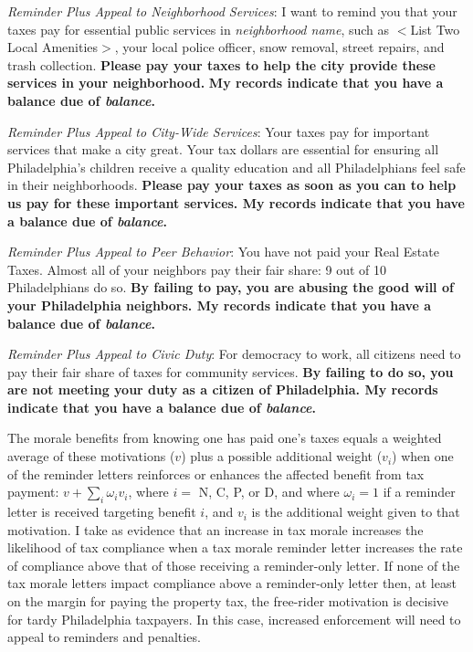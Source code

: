 \bigskip

\noindent \textit{Reminder Plus Appeal to Neighborhood Services}: I
want to remind you that your taxes pay for essential public services
in \textit{neighborhood name}, such as $<$List Two Local Amenities$>$,
your local police officer, snow removal, street repairs, and trash
collection.  \textbf{Please pay your taxes to help the city provide
  these services in your neighborhood.} \textbf{My records indicate
  that you have a balance due of \textit{balance}.}

\bigskip

\noindent \textit{Reminder Plus Appeal to City-Wide Services}: Your
taxes pay for important services that make a city great. Your tax
dollars are essential for ensuring all Philadelphia's children receive
a quality education and all Philadelphians feel safe in their
neighborhoods.  \textbf{Please pay your taxes as soon as you can to
  help us pay for these important services.  My records indicate that
  you have a balance due of \textit{balance}.}

\bigskip

\noindent \textit{Reminder Plus Appeal to Peer Behavior}: You have not
paid your Real Estate Taxes.  Almost all of your neighbors pay their
fair share: 9 out of 10 Philadelphians do so.  \textbf{By failing to
  pay, you are abusing the good will of your Philadelphia neighbors.
  My records indicate that you have a balance due of
  \textit{balance}.}

\bigskip

\noindent \textit{Reminder Plus Appeal to Civic Duty}: For democracy
to work, all citizens need to pay their fair share of taxes for
community services.  \textbf{By failing to do so, you are not meeting
  your duty as a citizen of Philadelphia.  My records indicate that
  you have a balance due of \textit{balance}.}

\bigskip

The morale benefits from knowing one has paid one's taxes equals a
weighted average of these motivations ($v$) plus a possible additional
weight ($v_{i}$) when one of the reminder letters reinforces or
enhances the affected benefit from tax payment: $v + \sum_{i}
\omega_{i} v_{i}$, where $i =$ N, C, P, or D, and where $\omega_{i} =
1$ if a reminder letter is received targeting benefit $i$, and $v_{i}$
is the additional weight given to that motivation. I take as evidence
that an increase in tax morale increases the likelihood of tax
compliance when a tax morale reminder letter increases the rate of
compliance above that of those receiving a reminder-only letter.  If
none of the tax morale letters impact compliance above a reminder-only
letter then, at least on the margin for paying the property tax, the
free-rider motivation is decisive for tardy Philadelphia
taxpayers.  In this case, increased enforcement will need to appeal to
reminders and penalties.


